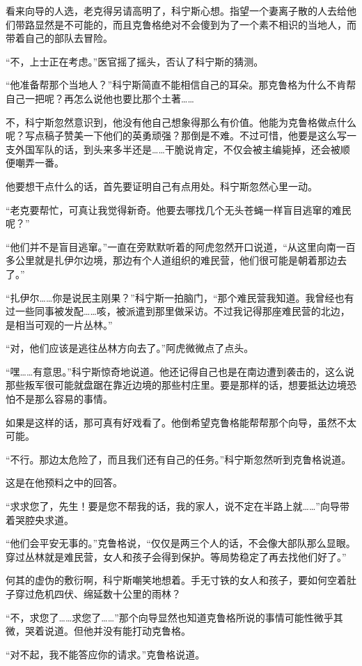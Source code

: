 看来向导的人选，老克得另请高明了，科宁斯心想。指望一个妻离子散的人去给他们带路显然是不可能的，而且克鲁格绝对不会傻到为了一个素不相识的当地人，而带着自己的部队去冒险。

“不，上士正在考虑。”医官摇了摇头，否认了科宁斯的猜测。

“他准备帮那个当地人？”科宁斯简直不能相信自己的耳朵。那克鲁格为什么不肯帮自己一把呢？再怎么说他也要比那个土著……

不，科宁斯忽然意识到，他没有他自己想象得那么有价值。他能为克鲁格做点什么呢？写点稿子赞美一下他们的英勇顽强？那倒是不难。不过可惜，他要是这么写一支外国军队的话，到头来多半还是……干脆说肯定，不仅会被主编毙掉，还会被顺便嘲弄一番。

他要想干点什么的话，首先要证明自己有点用处。科宁斯忽然心里一动。

“老克要帮忙，可真让我觉得新奇。他要去哪找几个无头苍蝇一样盲目逃窜的难民呢？”

“他们并不是盲目逃窜。”一直在旁默默听着的阿虎忽然开口说道，“从这里向南一百多公里就是扎伊尔边境，那边有个人道组织的难民营，他们很可能是朝着那边去了。”

“扎伊尔……你是说民主刚果？”科宁斯一拍脑门，“那个难民营我知道。我曾经也有过一些同事被发配……咳，被派遣到那里做采访。不过我记得那座难民营的北边，是相当可观的一片丛林。”

“对，他们应该是逃往丛林方向去了。”阿虎微微点了点头。

“嘿……有意思。”科宁斯惊奇地说道。他还记得自己也是在南边遭到袭击的，这么说那些叛军很可能就盘踞在靠近边境的那些村庄里。要是那样的话，想要抵达边境恐怕不是那么容易的事情。

如果是这样的话，那可真有好戏看了。他倒希望克鲁格能帮帮那个向导，虽然不太可能。

“不行。那边太危险了，而且我们还有自己的任务。”科宁斯忽然听到克鲁格说道。

这是在他预料之中的回答。

“求求您了，先生！要是您不帮我的话，我的家人，说不定在半路上就……”向导带着哭腔央求道。

“他们会平安无事的。”克鲁格说，“仅仅是两三个人的话，不会像大部队那么显眼。穿过丛林就是难民营，女人和孩子会得到保护。等局势稳定了再去找他们好了。”

何其的虚伪的敷衍啊，科宁斯嘲笑地想着。手无寸铁的女人和孩子，要如何空着肚子穿过危机四伏、绵延数十公里的雨林？

“不，求您了……求您了……”那个向导显然也知道克鲁格所说的事情可能性微乎其微，哭着说道。但他并没有能打动克鲁格。

“对不起，我不能答应你的请求。”克鲁格说道。

